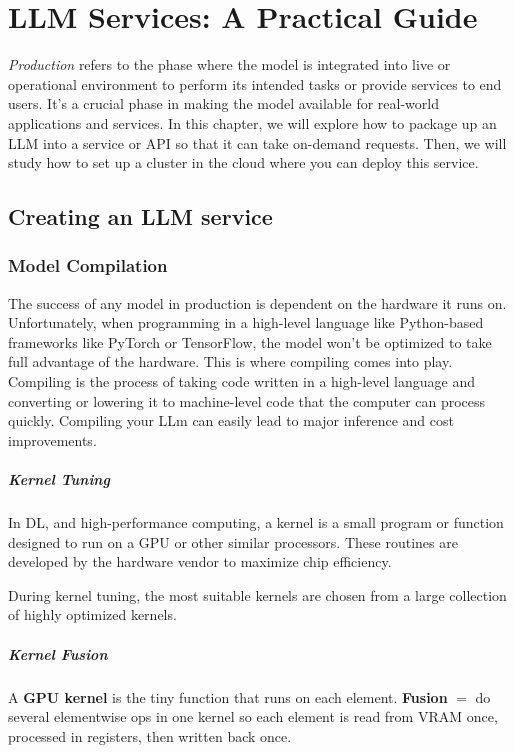 \chapter{LLM Services: A Practical Guide}

\textit{Production} refers to the phase where the model is integrated into live or operational environment to perform its intended tasks or provide services to end users. It's a crucial phase in making the model available for real-world applications and services. In this chapter, we will explore how to package up an LLM into a service or API so that it can take on-demand requests. Then, we will study how to set up a cluster in the cloud where you can deploy this service. 

\section{Creating an LLM service}

\subsection{Model Compilation}
The success of any model in production is dependent on the hardware it runs on. Unfortunately, when programming in a high-level language like Python-based frameworks like PyTorch or TensorFlow, the model won't be optimized to take full advantage of the hardware. This is where compiling comes into play. Compiling is the process of taking code written in a high-level language and converting or lowering it to machine-level code that the computer can process quickly. Compiling your LLm can easily lead to major inference and cost improvements. 

\paragraph{Kernel Tuning} In DL, and high-performance computing, a kernel is a small program or function designed to run on a GPU or other similar processors. These routines are developed by the hardware vendor to maximize chip efficiency. 

During kernel tuning, the most suitable kernels are chosen from a large collection of highly optimized kernels. 


\paragraph{Kernel Fusion}
A \textbf{GPU kernel} is the tiny function that runs on each element. \textbf{Fusion} $=$ do several elementwise ops in one kernel so each element is read from VRAM once, processed in registers, then written back once.

